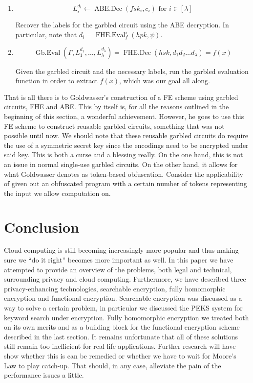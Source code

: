 \documentclass[11pt, a4paper]{article}
\newcommand{\op}[1]{\operatorname{#1}}
\begin{document}
\begin{enumerate}
    \item
        \[
            L_i^{d_i} \gets \op{ABE.Dec}(fsk_i, c_i) \text{ for } i \in [\lambda]
        \]

        Recover the labels for the garbled circuit using the ABE decryption. In particular, note that $d_i = \op{FHE.Eval}_f^i(hpk, \psi)$.
    \item
        \[
            \op{Gb.Eval}(\Gamma, L_1^{d_1}, \dots, L_{\lambda}^{d_{\lambda}}) = \op{FHE.Dec}(hsk, d_1 d_2 \dots d_{\lambda}) = f(x)
        \]

        Given the garbled circuit and the necessary labels, run the garbled evaluation function in order to extract $f(x)$, which was our goal all along.
\end{enumerate}

That is all there is to Goldwasser's construction of a FE scheme using garbled circuits, FHE and ABE.
This by itself is, for all the reasons outlined in the beginning of this section, a wonderful achievement.
However, he goes to use this FE scheme to construct reusable garbled circuits, something that was not possible until now.
We should note that these reusable garbled circuits do require the use of a symmetric secret key since the encodings need to be encrypted under said key.
This is both a curse and a blessing really.
On the one hand, this is not an issue in normal single-use garbled circuits.
On the other hand, it allows for what Goldwasser denotes as token-based obfuscation.
Consider the applicability of given out an obfuscated program with a certain number of tokens representing the input we allow computation on.

\section{Conclusion}
\label{sec:conclusion}

Cloud computing is still becoming increasingly more popular and thus making sure we ``do it right'' becomes more important as well.
In this paper we have attempted to provide an overview of the problems, both legal and technical, surrounding privacy and cloud computing.
Furthermore, we have described three privacy-enhancing technologies, searchable encryption, fully homomorphic encryption and functional encryption.
Searchable encryption was discussed as a way to solve a certain problem, in particular we discussed the PEKS system for keyword search under encryption.
Fully homomorphic encryption we treated both on its own merits and as a building block for the functional encryption scheme described in the last section.
It remains unfortunate that all of these solutions still remain too inefficient for real-life applications.
Further research will have show whether this is can be remedied or whether we have to wait for Moore's Law to play catch-up.
That should, in any case, alleviate the pain of the performance issues a little.
\end{document}
